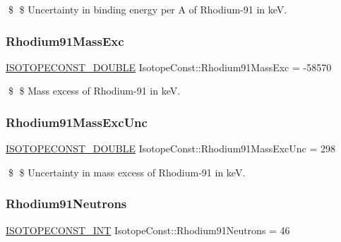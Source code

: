 \$ \$ Uncertainty in binding energy per A of Rhodium-\/91 in keV. \mbox{\label{group___isotope_const-_rhodium-_rh91_gaf18e0c6f96527ea825072f2e0302f7c0}} 
\subsubsection{\texorpdfstring{Rhodium91\+Mass\+Exc}{Rhodium91MassExc}}
{\footnotesize\ttfamily \mbox{\hyperlink{group___isotope_const-_macros_ga8f45a7272ce02c0b4c65c44636ed719a}{I\+S\+O\+T\+O\+P\+E\+C\+O\+N\+S\+T\+\_\+\+D\+O\+U\+B\+LE}} Isotope\+Const\+::\+Rhodium91\+Mass\+Exc = -\/58570}

\$ \$ Mass excess of Rhodium-\/91 in keV. \mbox{\label{group___isotope_const-_rhodium-_rh91_gadfef2e31ad447482896afc0a537b8f7b}} 
\subsubsection{\texorpdfstring{Rhodium91\+Mass\+Exc\+Unc}{Rhodium91MassExcUnc}}
{\footnotesize\ttfamily \mbox{\hyperlink{group___isotope_const-_macros_ga8f45a7272ce02c0b4c65c44636ed719a}{I\+S\+O\+T\+O\+P\+E\+C\+O\+N\+S\+T\+\_\+\+D\+O\+U\+B\+LE}} Isotope\+Const\+::\+Rhodium91\+Mass\+Exc\+Unc = 298}

\$ \$ Uncertainty in mass excess of Rhodium-\/91 in keV. \mbox{\label{group___isotope_const-_rhodium-_rh91_gae11d54be3b0e8502882440a3bb665b33}} 
\subsubsection{\texorpdfstring{Rhodium91\+Neutrons}{Rhodium91Neutrons}}
{\footnotesize\ttfamily \mbox{\hyperlink{group___isotope_const-_macros_ga5f18360b3e99483a35c32d789e62621c}{I\+S\+O\+T\+O\+P\+E\+C\+O\+N\+S\+T\+\_\+\+I\+NT}} Isotope\+Const\+::\+Rhodium91\+Neutrons = 46}

